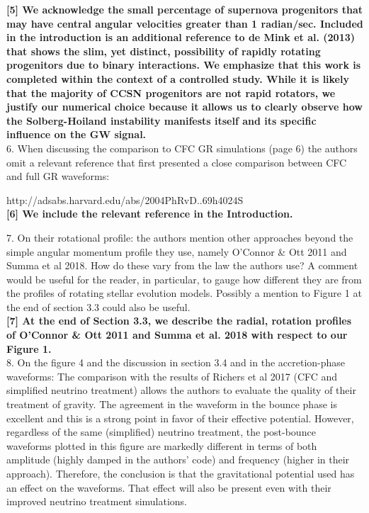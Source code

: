 \documentclass[11pt]{article}
\begin{document}
\textbf{[5] We acknowledge the small percentage of supernova progenitors that may have central angular velocities greater than 1 radian/sec.  Included in the introduction is an additional reference to de Mink et al. (2013) that shows the slim, yet distinct, possibility of rapidly rotating progenitors due to binary interactions.  We emphasize that this work is completed within the context of a controlled study.  While it is likely that the majority of CCSN progenitors are not rapid rotators, we justify our numerical choice because it allows us to clearly observe how the Solberg-Hoiland instability manifests itself and its specific influence on the GW signal.}\\

6. When discussing the comparison to CFC GR simulations (page 6) the authors 
omit a relevant reference that first presented a close comparison between CFC 
and full GR waveforms: 

http://adsabs.harvard.edu/abs/2004PhRvD..69h4024S\\

\textbf{[6] We include the relevant reference in the Introduction.}


7. On their rotational profile: the authors mention other approaches beyond the 
simple angular momentum profile they use, namely O'Connor \& Ott 2011 and Summa et al 2018. How do these vary from the law the authors use? A comment would be useful for the reader, in particular, to gauge how different they are from the profiles of rotating stellar evolution models. Possibly a mention to Figure 1 at the end of section 3.3 could also be useful. \\

\textbf{[7] At the end of Section 3.3, we describe the radial, rotation profiles of O’Connor \& Ott 2011 and Summa et al. 2018 with respect to our Figure 1.}\\

8. On the figure 4 and the discussion in section 3.4 and in the accretion-phase 
waveforms: The comparison with the results of Richers et al 2017 (CFC and
simplified neutrino treatment) allows the authors to evaluate the quality of
their treatment of gravity. The agreement in the waveform in the bounce phase 
is excellent and this is a strong point in favor of their effective potential. 
However, regardless of the same (simplified) neutrino treatment, the post-bounce  waveforms plotted in this figure are markedly different in terms of both amplitude  (highly damped in the authors' code) and frequency (higher in their approach).  Therefore, the conclusion is that the gravitational potential used has an effect on the waveforms. That effect will also be present even with their improved neutrino treatment simulations.
\end{document}
